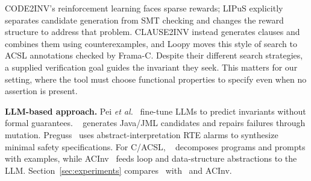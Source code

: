 CODE2INV's reinforcement learning faces sparse rewards; LIPuS explicitly
separates candidate generation from SMT checking and changes the reward
structure to address that problem. CLAUSE2INV instead generates clauses and
combines them using counterexamples, and Loopy moves this style of search to
ACSL annotations checked by Frama-C. Despite their different search
strategies, a supplied verification goal guides the invariant they seek.
This matters for our setting, where the tool must choose functional properties
to specify even when no assertion is present.

\smallskip
\noindent\textbf{LLM-based approach.}
Pei \emph{et al.}~\cite{Can_Large_Language_Models_Reason_About_Program_Invariants} fine-tune LLMs to predict invariants without formal guarantees. \specgen~\cite{SpecGen} generates Java/JML candidates and repairs failures through mutation. Preguss~\cite{Wang2025ATO} uses abstract-interpretation RTE alarms to synthesize minimal safety specifications. For C/ACSL, \autospec~\cite{autospec} decomposes programs and prompts with examples, while ACInv~\cite{Enhancing_Automated_Loop_Invariant_Generation_for_Complex_Programs_with_Large_Language_Models} feeds loop and data-structure abstractions to the LLM. Section~\ref{sec:experiments} compares \toolname\ with \autospec\ and ACInv.


